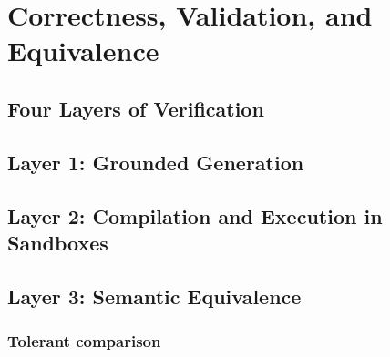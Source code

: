 \chapter{Correctness, Validation, and Equivalence}
\label{chap:validation}

\section{Four Layers of Verification}
\label{sec:validation-layers}


\section{Layer 1: Grounded Generation}
\label{sec:validation-grounding}


\section{Layer 2: Compilation and Execution in Sandboxes}
\label{sec:validation-sandbox}


\section{Layer 3: Semantic Equivalence}
\label{sec:validation-equivalence}



\subsection{Tolerant comparison}



